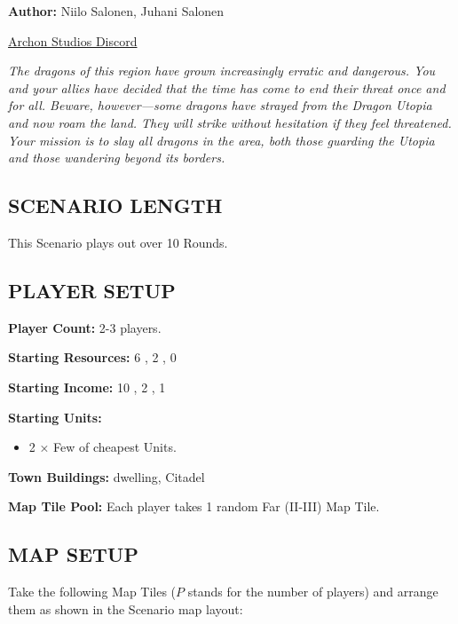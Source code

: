 
\begin{multicols*}{2}

\textbf{Author:} Niilo Salonen, Juhani Salonen

\href{https://discord.com/channels/740870068178649108/1161571991732625468/threads/1432372875658137752}{Archon Studios Discord}

\textit{The dragons of this region have grown increasingly erratic and dangerous. You and your allies have decided that the time has come to end their threat once and for all. Beware, however—some dragons have strayed from the
Dragon Utopia and now roam the land. They will strike without hesitation if they feel threatened. Your mission
is to slay all dragons in the area, both those guarding the Utopia and those wandering beyond its borders.}  %

\subsection*{\MakeUppercase{Scenario Length}}
This Scenario plays out over 10 Rounds.

\subsection*{\MakeUppercase{Player Setup}}
\textbf{Player Count:} 2-3 players.

\textbf{Starting Resources:} 6 , 2 , 0 

\textbf{Starting Income:} 10 , 2 , 1 

\textbf{Starting Units:}

\begin{itemize}
  \item 2 × Few of cheapest \bronze Units.
\end{itemize}

\textbf{Town Buildings:} \bronze dwelling, Citadel

\textbf{Map Tile Pool:} Each player takes 1 random Far (II-III) Map Tile.

\subsection*{\MakeUppercase{Map Setup}}
Take the following Map Tiles ($P$ stands for the number of players) and arrange them as shown in the Scenario map layout:



\end{multicols*}
